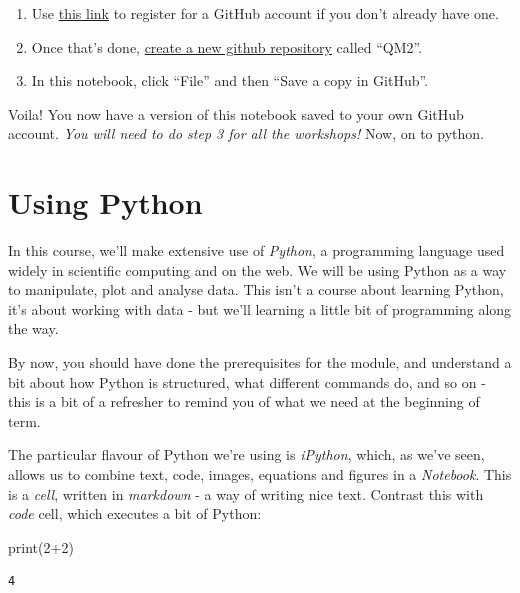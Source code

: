 \documentclass[
  letterpaper,
  DIV=11,
  numbers=noendperiod]{scrreprt}
\newenvironment{Shaded}{\begin{snugshade}}{\end{snugshade}}
\newcommand{\BuiltInTok}[1]{\textcolor[rgb]{0.00,0.23,0.31}{#1}}
\newcommand{\DecValTok}[1]{\textcolor[rgb]{0.68,0.00,0.00}{#1}}
\newcommand{\NormalTok}[1]{\textcolor[rgb]{0.00,0.23,0.31}{#1}}
\newcommand{\OperatorTok}[1]{\textcolor[rgb]{0.37,0.37,0.37}{#1}}
\providecommand{\tightlist}{%
  \setlength{\itemsep}{0pt}\setlength{\parskip}{0pt}}\usepackage{longtable,booktabs,array}
\begin{document}
\begin{enumerate}
\def\labelenumi{\arabic{enumi}.}
\tightlist
\item
  Use \href{https://github.com/join}{this link} to register for a GitHub
  account if you don't already have one.
\item
  Once that's done, \href{https://github.com/new}{create a new github
  repository} called ``QM2''.
\item
  In this notebook, click ``File'' and then ``Save a copy in GitHub''.
\end{enumerate}

Voila! You now have a version of this notebook saved to your own GitHub
account. \emph{You will need to do step 3 for all the workshops!} Now,
on to python.

\hypertarget{using-python}{%
\section{Using Python}\label{using-python}}

In this course, we'll make extensive use of \emph{Python}, a programming
language used widely in scientific computing and on the web. We will be
using Python as a way to manipulate, plot and analyse data. This isn't a
course about learning Python, it's about working with data - but we'll
learning a little bit of programming along the way.

By now, you should have done the prerequisites for the module, and
understand a bit about how Python is structured, what different commands
do, and so on - this is a bit of a refresher to remind you of what we
need at the beginning of term.

The particular flavour of Python we're using is \emph{iPython}, which,
as we've seen, allows us to combine text, code, images, equations and
figures in a \emph{Notebook}. This is a \emph{cell}, written in
\emph{markdown} - a way of writing nice text. Contrast this with
\emph{code} cell, which executes a bit of Python:

\begin{Shaded}
\begin{Highlighting}[]
\BuiltInTok{print}\NormalTok{(}\DecValTok{2}\OperatorTok{+}\DecValTok{2}\NormalTok{)}
\end{Highlighting}
\end{Shaded}

\begin{verbatim}
4
\end{verbatim}
\end{document}
